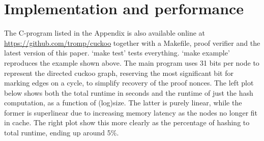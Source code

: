 \documentclass[11pt, oneside]{article}
\begin{document}
\section{Implementation and performance}
The C-program listed in the Appendix is also available online at
\url{https://github.com/tromp/cuckoo} together with a Makefile,
proof verifier and the latest version of this paper. `make test' tests everything.
`make example' reproduces the example shown above.
The main program uses 31 bits per node to represent the
directed cuckoo graph, reserving the most significant bit
for marking edges on a cycle, to simplify recovery of the proof nonces.
The left plot below shows both the total runtime in seconds and the runtime of just
the hash computation, as a function of (log)size. The latter is purely
linear, while the former is superlinear due to increasing memory latency
as the nodes no longer fit in cache. The right plot show this more clearly
as the percentage of hashing to total runtime, ending up around 5\%.

\begin{center}
\hspace{1cm}
\end{center}
\end{document}
